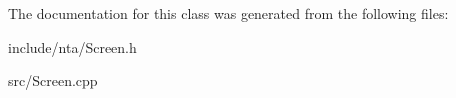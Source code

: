 The documentation for this class was generated from the following files\+:\begin{DoxyCompactItemize}
\item 
include/nta/Screen.\+h\item 
src/Screen.\+cpp\end{DoxyCompactItemize}
